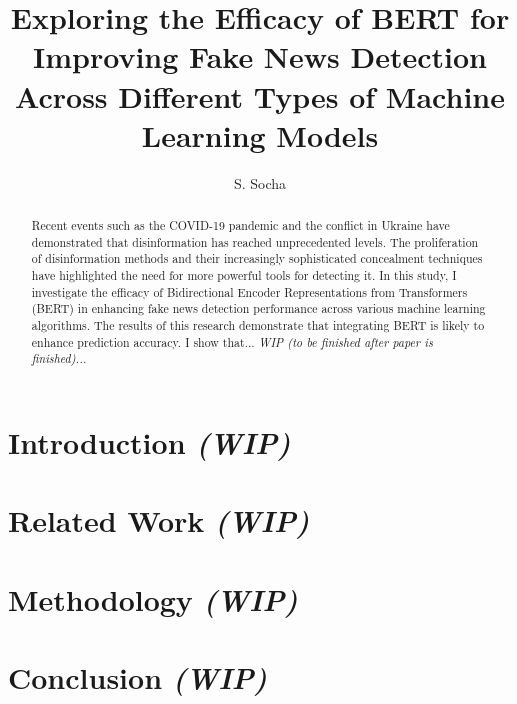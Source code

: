 \documentclass[
  journal=largetwo,
  manuscript=article-type,
  year=2023,
  volume=1,
]{cup-journal}
\title{Exploring the Efficacy of BERT for Improving Fake News Detection Across Different Types of Machine Learning Models}
\author{S. Socha}
\affiliation{Faculty of Economic Sciences, University of Warsaw, Warsaw, Poland}
\begin{document}
\begin{abstract}
Recent events such as the COVID-19 pandemic and the conflict in Ukraine have demonstrated that disinformation has reached unprecedented levels. The proliferation of disinformation methods and their increasingly sophisticated concealment techniques have highlighted the need for more powerful tools for detecting it. In this study, I investigate the efficacy of Bidirectional Encoder Representations from Transformers (BERT) in enhancing fake news detection performance across various machine learning algorithms. The results of this research demonstrate that integrating BERT is likely to enhance prediction accuracy. I show that... \textit{WIP (to be finished after paper is finished)...}
\end{abstract}


\section{Introduction \textit{(WIP)}}


\section{Related Work \textit{(WIP)}}


\section{Methodology \textit{(WIP)}}


\section{Conclusion \textit{(WIP)}}




\printendnotes

\printbibliography
\end{document}
